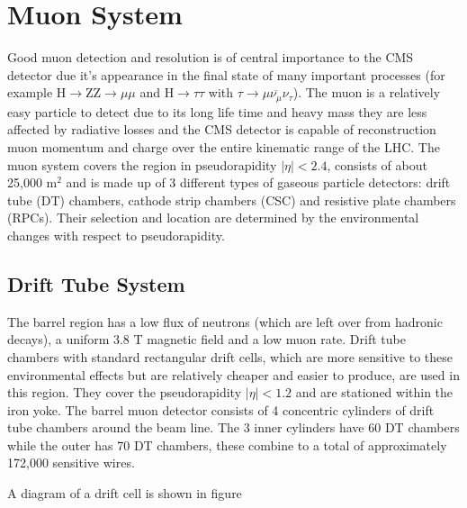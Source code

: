 \section{Muon System}
Good muon detection and resolution is of central importance 
to the CMS detector due it's appearance in the final state of many important processes
(for example H$\rightarrow$ZZ$\rightarrow\mu\mu$ and H$\rightarrow\tau\tau$ 
with $\tau\rightarrow\mu\overbar{\nu_{\mu}}\nu_{\tau}$). 
The muon is a relatively easy particle to detect due to its long life time 
and heavy mass they are less affected by radiative losses and the
CMS detector is capable of reconstruction muon momentum and charge over the entire
kinematic range of the LHC. The muon system covers the region in pseudorapidity
$|\eta|<2.4$, consists of about 25,000 m$^{2}$ and is made up of 3
 different types of gaseous particle detectors: drift tube (DT) chambers, 
 cathode strip chambers (CSC) and resistive plate chambers (RPCs).
 Their selection and location are determined by the environmental
 changes with respect to pseudorapidity. %
 
\subsection{Drift Tube System}
The barrel region has a low flux of neutrons (which are left over 
from hadronic decays), a uniform 3.8 T magnetic field and a low 
muon rate. Drift tube chambers with standard rectangular drift cells, 
which are more sensitive to  these environmental effects but are %
relatively cheaper and easier to produce, are used in this region. 
They cover the pseudorapidity $|\eta|<1.2$ and are stationed within 
the iron yoke. The barrel muon detector consists of 4 concentric
cylinders of drift tube chambers around the beam line. The 3 inner
cylinders have 60 DT chambers while the outer has 70 DT chambers,
these combine to a total of approximately 172,000 sensitive wires.

A diagram of a drift cell is shown in figure %

